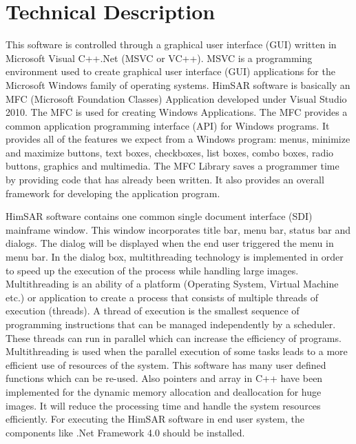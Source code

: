\section{Technical Description}

This software is controlled through a graphical user interface (GUI) written in Microsoft Visual C++.Net (MSVC or VC++). MSVC is a programming environment used to create graphical user interface (GUI) applications for the Microsoft Windows family of operating systems. HimSAR software is basically an MFC (Microsoft Foundation Classes) Application developed under Visual Studio 2010.  The MFC is used for creating Windows Applications.  The MFC provides a common application programming interface (API) for Windows programs.  It provides all of the features we expect from a Windows program: menus, minimize and maximize buttons, text boxes, checkboxes, list boxes, combo boxes, radio buttons, graphics and multimedia.  The MFC Library saves a programmer time by providing code that has already been written. It also provides an overall framework for developing the application program.

HimSAR software contains one common single document interface (SDI) mainframe window. This window incorporates title bar, menu bar, status bar and dialogs. The dialog will be displayed when the end user triggered the menu in menu bar. In the dialog box, multithreading technology is implemented in order to speed up the execution of the process while handling large images. Multithreading is an ability of a platform (Operating System, Virtual Machine  etc.) or application to create a process that consists of multiple threads of execution (threads). A thread of execution is the smallest sequence of programming instructions that can be managed independently by a scheduler. These threads can run in parallel which can increase the efficiency of programs. Multithreading is used when the parallel execution of some tasks leads to a more efficient use of resources of the system. This software has many user defined functions which can be re-used. Also pointers and array in C++ have been implemented for the dynamic memory allocation and deallocation for huge images. It will reduce the processing time and handle the system resources efficiently. For executing the HimSAR software in end user system, the components like .Net Framework 4.0 should be installed.
